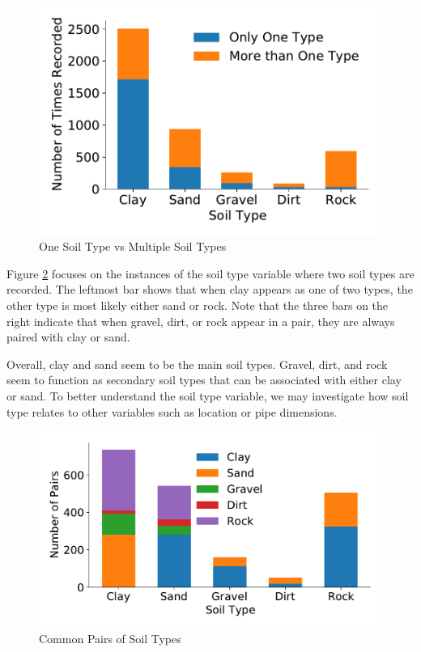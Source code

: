 \documentclass[twocolumn]{article}
\begin{document}
\begin{figure}[H]
    \includegraphics[width=\columnwidth]{Bryan/one_vs_multiple_soil_types.pdf}
    \caption{One Soil Type vs Multiple Soil Types}
    \label{fig:One vs. Many Soil Type}
\end{figure}

Figure \ref{fig:Soil Type Pairs} focuses on the instances of the soil type variable where two soil types are recorded. The leftmost bar shows that when clay appears as one of two types, the other type is most likely either sand or rock. Note that the three bars on the right indicate that when gravel, dirt, or rock appear in a pair, they are always paired with clay or sand. 

Overall, clay and sand seem to be the main soil types. Gravel, dirt, and rock seem to function as secondary soil types that can be associated with either clay or sand. To better understand the soil type variable, we may investigate how soil type relates to other variables such as location or pipe dimensions.

\begin{figure}[H]
    \includegraphics[width=\columnwidth]{Bryan/soil_type_pairs.pdf}
    \caption{Common Pairs of Soil Types}
    \label{fig:Soil Type Pairs}
\end{figure}
\end{document}
